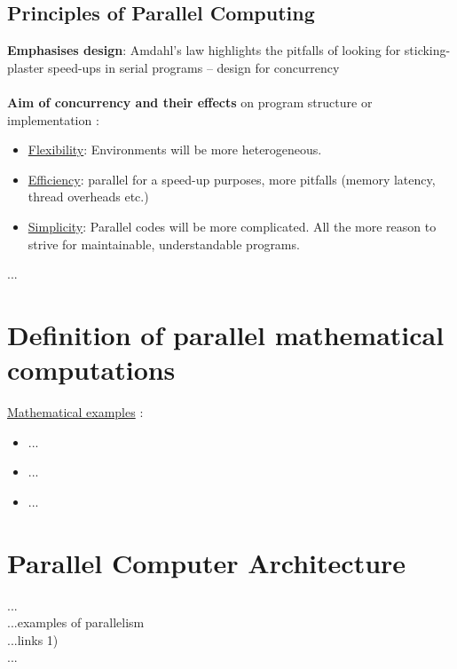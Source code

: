 \newpage

\subsection{Principles of Parallel Computing}

\textbf{Emphasises design}:
Amdahl's law highlights the pitfalls of looking for
sticking-plaster speed-ups in serial programs –
design for concurrency \parencite[see][p4]{article6}
\\\\\textbf{Aim of concurrency and their effects} on program structure or implementation \parencite[see][p5]{article6}:
\begin{itemize}
  \item \underline{Flexibility}: Environments will be more heterogeneous.
  \item \underline{Efficiency}:	parallel for a speed-up purposes, more pitfalls (memory latency, thread overheads etc.)
  \item \underline{Simplicity}:	Parallel codes will be more complicated. All the more reason to strive for maintainable, understandable programs.\\
\end{itemize}
...\parencite[see][p11 ff.]{article6}

\newpage

\section{Definition of parallel mathematical computations}

\underline{Mathematical examples} \parencite{inbook1}:
\begin{itemize}
	\item ...\parencite[see][p8]{internet1}
	\item ...\parencite[see][p4]{internet2}
	\item ...\parencite[see][p398]{article7}
\end{itemize}

\newpage

\section{Parallel Computer Architecture}

...\parencite[see][p9]{book1} \\
...examples of parallelism \parencite[see][p11]{book1} \\
...links 1) \\
...\parencite[see][p9 ff.]{book5}


